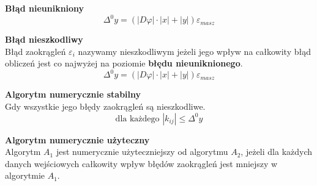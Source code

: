 \documentclass[../mn-notatki.tex]{subfiles}
\begin{document}
\begin{tcolorbox}
\textbf{Błąd nieunikniony}\\
\[
\Delta^0y = \left(|D\varphi|\cdot|x| + |y| \right)\varepsilon_{masz}
\]
\end{tcolorbox}

\begin{tcolorbox}
\textbf{Błąd nieszkodliwy}\\
Błąd zaokrągleń $\varepsilon_i$ nazywamy nieszkodliwym jeżeli jego wpływ na
całkowity błąd obliczeń jest co najwyżej na poziomie \textbf{błędu nieuniknionego}.\\
\[
\Delta^0y = \left(|D\varphi|\cdot|x| + |y| \right)\varepsilon_{masz}
\]
\end{tcolorbox}

\begin{tcolorbox}
\textbf{Algorytm numerycznie stabilny}\\
Gdy wszystkie jego błędy zaokrągleń są nieszkodliwe.
\[
\text{dla każdego~} |k_{ij}|\leqslant \Delta^0y
\]
\end{tcolorbox}

\begin{tcolorbox}
\textbf{Algorytm numerycznie użyteczny}\\
Algorytm $A_1$ jest numerycznie użyteczniejszy od algorytmu $A_2$, jeżeli dla
każdych danych wejściowych całkowity wpływ błędów zaokrągleń jest mniejszy
w algorytmie $A_1$.
\end{tcolorbox}

\pagebreak
\end{document}
